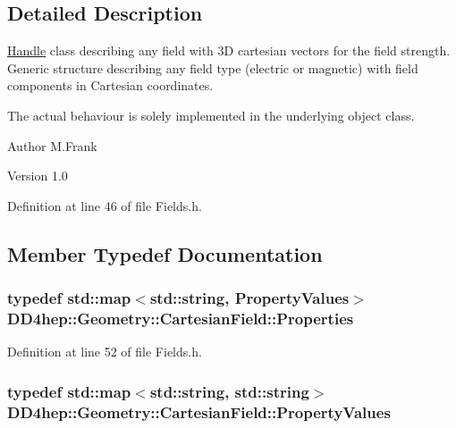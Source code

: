 \subsection{Detailed Description}
\hyperlink{class_d_d4hep_1_1_handle}{Handle} class describing any field with 3D cartesian vectors for the field strength. Generic structure describing any field type (electric or magnetic) with field components in Cartesian coordinates.

The actual behaviour is solely implemented in the underlying object class.

\begin{DoxyAuthor}{Author}
M.Frank 
\end{DoxyAuthor}
\begin{DoxyVersion}{Version}
1.0 
\end{DoxyVersion}


Definition at line 46 of file Fields.h.

\subsection{Member Typedef Documentation}
\hypertarget{class_d_d4hep_1_1_geometry_1_1_cartesian_field_a37a636b9f5ee9ead172cca958dacb920}{
\subsubsection[{Properties}]{\setlength{\rightskip}{0pt plus 5cm}typedef std::map$<$std::string, {\bf PropertyValues}$>$ {\bf DD4hep::Geometry::CartesianField::Properties}}}
\label{class_d_d4hep_1_1_geometry_1_1_cartesian_field_a37a636b9f5ee9ead172cca958dacb920}


Definition at line 52 of file Fields.h.\hypertarget{class_d_d4hep_1_1_geometry_1_1_cartesian_field_a05dc63b1528e795f7d877d3fb236c394}{
\subsubsection[{PropertyValues}]{\setlength{\rightskip}{0pt plus 5cm}typedef std::map$<$std::string, std::string$>$ {\bf DD4hep::Geometry::CartesianField::PropertyValues}}}
\label{class_d_d4hep_1_1_geometry_1_1_cartesian_field_a05dc63b1528e795f7d877d3fb236c394}


